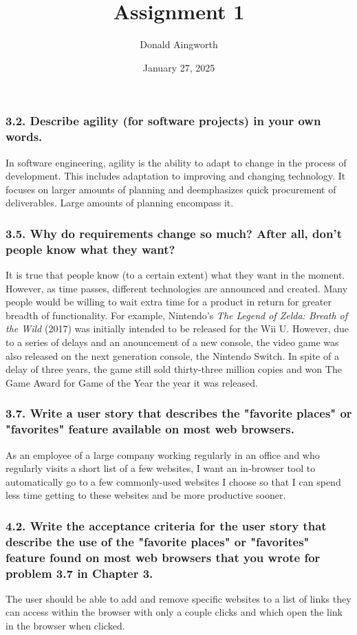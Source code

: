 \documentclass[12pt]{article}
\title{Assignment 1}
\author{Donald Aingworth}
\date{January 27, 2025}
\begin{document}
\maketitle

\subsubsection*{3.2. Describe agility (for software projects) in your own words.}
In software engineering, agility is the ability to adapt to change in the process of development. This includes adaptation to improving and changing technology. It focuses on larger amounts of planning and deemphasizes quick procurement of deliverables. Large amounts of planning encompass it.

\subsubsection*{3.5. Why do requirements change so much? After all, don't people know what they want?}
It is true that people know (to a certain extent) what they want in the moment. However, as time passes, different technologies are announced and created. Many people would be willing to wait extra time for a product in return for greater breadth of functionality. For example, Nintendo's \textit{The Legend of Zelda: Breath of the Wild} (2017) was initially intended to be released for the Wii U. However, due to a series of delays and an anouncement of a new console, the video game was also \texttimes released on the next generation console, the Nintendo Switch. In spite of a delay of three years, the game still sold thirty-three million copies and won The Game Award for Game of the Year the year it was released.

\subsubsection*{3.7. Write a user story that describes the "favorite places" or "favorites" feature available on most web browsers.}
As an employee of a large company working regularly in an office and who regularly visits a short list of a few websites, I want an in-browser tool to automatically go to a few commonly-used websites I choose so that I can spend less time getting to these websites and be more productive sooner.

\subsubsection*{4.2. Write the acceptance criteria for the user story that describe the use of the "favorite places" or "favorites" feature found on most web browsers that you wrote for problem 3.7 in Chapter 3.}
The user should be able to add and remove specific websites to a list of links they can access within the browser with only a couple clicks and which open the link in the browser when clicked.
\end{document}
